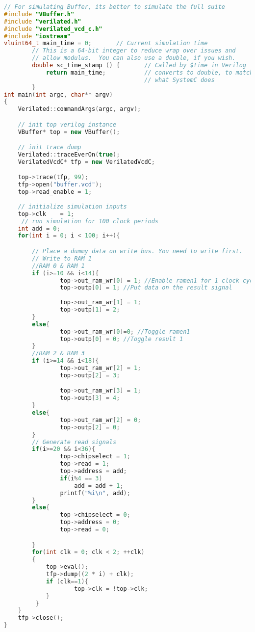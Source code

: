 \documentclass[twoside,12pt,fleqn]{book} %
\begin{document}
\begin{lstlisting}[language=C++]
// For simulating Buffer, its better to simulate the full suite
#include "VBuffer.h" 
#include "verilated.h" 
#include "verilated_vcd_c.h" 
#include "iostream"
vluint64_t main_time = 0;       // Current simulation time
        // This is a 64-bit integer to reduce wrap over issues and
        // allow modulus.  You can also use a double, if you wish.
        double sc_time_stamp () {       // Called by $time in Verilog
            return main_time;           // converts to double, to match
                                        // what SystemC does
        }
int main(int argc, char** argv)
{
    Verilated::commandArgs(argc, argv);

    // init top verilog instance
    VBuffer* top = new VBuffer();

    // init trace dump
    Verilated::traceEverOn(true);
    VerilatedVcdC* tfp = new VerilatedVcdC;

    top->trace(tfp, 99);
    tfp->open("buffer.vcd");
    top->read_enable = 1;
     
    // initialize simulation inputs
    top->clk    = 1;
     // run simulation for 100 clock periods
    int add = 0;
    for(int i = 0; i < 100; i++){

        // Place a dummy data on write bus. You need to write first.
        // Write to RAM 1
        //RAM 0 & RAM 1
        if (i>=10 && i<14){
                top->out_ram_wr[0] = 1; //Enable ramen1 for 1 clock cycles
                top->outp[0] = 1; //Put data on the result signal
                
                top->out_ram_wr[1] = 1;
                top->outp[1] = 2;
        }
        else{
                top->out_ram_wr[0]=0; //Toggle ramen1
                top->outp[0] = 0; //Toggle result 1
        }
        //RAM 2 & RAM 3 
        if (i>=14 && i<18){
                top->out_ram_wr[2] = 1;
                top->outp[2] = 3;

                top->out_ram_wr[3] = 1;
                top->outp[3] = 4;
        }
        else{
                top->out_ram_wr[2] = 0;
                top->outp[2] = 0;
        }
        // Generate read signals
        if(i>=20 && i<36){
                top->chipselect = 1;
                top->read = 1;
                top->address = add;
                if(i%4 == 3)
                    add = add + 1;
                printf("%i\n", add);
        }
        else{
                top->chipselect = 0;
                top->address = 0;
                top->read = 0;

        }
        for(int clk = 0; clk < 2; ++clk)
        {
            top->eval();
            tfp->dump((2 * i) + clk);
            if (clk==1){
                    top->clk = !top->clk;
            }
         }
    }
    tfp->close();
}
\end{lstlisting}
\end{document}
